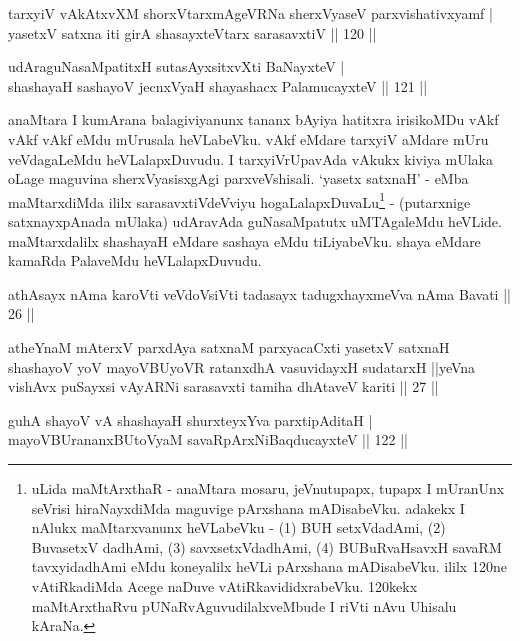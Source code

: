 \begin{shl}
tarxyiV vAkAtxvXM shorxVtarxmAgeVRNa sherxVyaseV parxvishativxyamf | \\
yasetxV satxna iti girA shasayxteV\s tarx sarasavxtiV \hfill|| 120 || 
\end{shl}

\begin{shl}
udAraguNasaMpatitxH sutasAyxsitxvXti BaNayxteV | \\
shashayaH sashayoV jecnxVyaH shayashacx PalamucayxteV \hfill|| 121 || 
\end{shl}

\begin{artha}
anaMtara I kumArana balagiviyanunx tananx bAyiya hatitxra irisikoMDu 
vAkf vAkf vAkf eMdu mUrusala heVLabeVku. vAkf eMdare tarxyiV aMdare 
mUru veVdagaLeMdu heVLalapxDuvudu. I tarxyiVrUpavAda vAkukx kiviya 
mUlaka oLage maguvina sherxVyasisxgAgi parxveVshisali. `yasetx satxnaH' 
- eMba maMtarxdiMda ililx sarasavxtiVdeVviyu 
hogaLalapxDuvaLu\footnote[1]{uLida maMtArxthaR - anaMtara mosaru, 
jeVnutupapx, tupapx I mUranUnx seVrisi hiraNayxdiMda maguvige 
pArxshana mADisabeVku. adakekx I nAlukx maMtarxvanunx heVLabeVku - (1) 
BUH setxVdadAmi, (2) BuvasetxV dadhAmi, (3) savxsetxVdadhAmi, (4) 
BUBuRvaHsavxH savaRM tavxyidadhAmi eMdu koneyalilx heVLi pArxshana 
mADisabeVku. ililx 120ne vAtiRkadiMda Acege naDuve 
vAtiRkavididxrabeVku. 120kekx maMtArxthaRvu pUNaRvAguvudilalxveMbude I 
riVti nAvu Uhisalu kAraNa.} - (putarxnige satxnayxpAnada mUlaka) 
udAravAda guNasaMpatutx uMTAgaleMdu heVLide. maMtarxdalilx shashayaH 
eMdare sashaya eMdu tiLiyabeVku. shaya eMdare kamaRda PalaveMdu 
heVLalapxDuvudu.
\end{artha}


\begin{shl}
athAsayx nAma karoVti veVdoV\s siVti tadasayx tadugxhayxmeVva nAma Bavati || 26 ||
\end{shl}

\begin{shl}
atheYnaM mAterxV parxdAya satxnaM parxyacaCxti yasetxV satxnaH shashayoV yoV mayoVBUyoVR ratanxdhA vasuvidayxH sudatarxH ||yeVna vishAvx puSayxsi vAyARNi sarasavxti tamiha dhAtaveV kariti || 27 ||
\end{shl}

\begin{shl}
guhA shayoV vA shashayaH shurxteyxYva parxtipAditaH | \\
mayoVBUrananxBUtoV\s yaM savaRpArxNiBaqducayxteV \hfill|| 122 || 
\end{shl}

